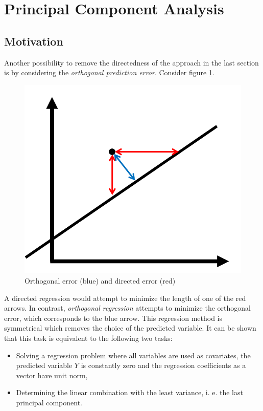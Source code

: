 \documentclass[]{report}
\providecommand{\tightlist}{%
  \setlength{\itemsep}{0pt}\setlength{\parskip}{0pt}}
\theoremstyle{definition}
\theoremstyle{definition}
\theoremstyle{definition}
\theoremstyle{remark}
\begin{document}
\hypertarget{linear-pca}{%
\section{Principal Component Analysis}\label{linear-pca}}

\hypertarget{motivation-1}{%
\subsection{Motivation}\label{motivation-1}}

Another possibility to remove the directedness of the approach in the
last section is by considering the \emph{orthogonal prediction error}.
Consider figure \ref{fig:ortho}.

\begin{figure}

{\centering \includegraphics[width=0.5\linewidth]{figs/ortho} 

}

\caption{Orthogonal error (blue) and directed error (red)}\label{fig:ortho}
\end{figure}

A directed regression would attempt to minimize the length of one of the
red arrows. In contrast, \emph{orthogonal regression} attempts to
minimize the orthogonal error, which corresponds to the blue arrow. This
regression method is symmetrical which removes the choice of the
predicted variable. It can be shown that this task is equivalent to the
following two tasks:

\begin{itemize}
\tightlist
\item
  Solving a regression problem where all variables are used as
  covariates, the predicted variable \(Y\) is constantly zero and the
  regression coefficients as a vector have unit norm,
\item
  Determining the linear combination with the least variance, i. e. the
  last principal component.
\end{itemize}
\end{document}
